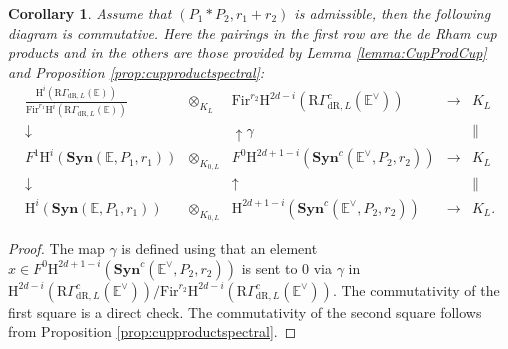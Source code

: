 \documentclass[asterisque,english]{smfart}
\newtheorem{cor}[theo]{Corollary}
\begin{document}
\begin{cor}
\label{cor:Poly R3bis} Assume that $\left( P_{1}\ast P_{2},r_{1}+r_{2}\right) $ is
admissible, then the following diagram is commutative. Here the pairings in the first row are the de Rham cup products and in the others are those provided by Lemma \ref{lemma:CupProdCup} and Proposition  \ref{prop:cupproductspectral}:
$$
\begin{array}{ccccc}
\frac{\mathrm{H}^{i}\left( \mathrm{R}\Gamma _{\mathrm{dR},L}\left( \mathbb{E}
\right) \right) }{\mathrm{Fir}^{r_{1}}\mathrm{H}^{i}\left(  \mathrm{R}\Gamma _{
\mathrm{dR},L}\left( \mathbb{E}\right) \right) } & \otimes _{K_{L}}
& \mathrm{Fir}^{r_{2}}\mathrm{H}^{2d-i}\left( \mathrm{R} \Gamma _{\mathrm{dR}
,L}^{c}\left( \mathbb{E}^\vee\right) \right) & \longrightarrow & K_{L} \\ 
\downarrow &  & \uparrow \gamma &  & \parallel \\ 
F^{1}\mathrm{H}^{i}\left( \mathbf{Syn}\left( \mathbb{E},P_1,r_1
\right) \right) & \otimes _{K_{0,L}} & F^{0}\mathrm{H}^{2d+1-i}\left( 
\mathbf{Syn}^{c}\left( \mathbb{E}^\vee,P_2,r_2\right) \right) & 
\longrightarrow & K_{L} \\ 
\downarrow &  & \uparrow &  & \parallel \\ 
\mathrm{H}^{i}\left( \mathbf{Syn}\left( \mathbb{E},P_1,r_1
\right) \right) & \otimes _{K_{0,L}} & \mathrm{H}^{2d+1-i}\left( \mathbf{
Syn}^{c}\left( \mathbb{E}^\vee,P_2,r_2\right) \right) & \longrightarrow
& K_{L}.
\end{array}
$$
\end{cor}
\begin{proof} The map $\gamma$ is defined using that an element $x\in F^{0}\mathrm{H}^{2d+1-i}\left( 
\mathbf{Syn}^{c}\left( \mathbb{E}^\vee,P_2,r_2\right) \right)$ is sent to $0$ via $\gamma$ in  $\mathrm{H}^{2d-i}\left( \mathrm{R} \Gamma _{\mathrm{dR}
,L}^{c}\left( \mathbb{E}^\vee\right) \right)/\mathrm{Fir}^{r_{2}}\mathrm{H}^{2d-i}\left( \mathrm{R} \Gamma _{\mathrm{dR} ,L}^{c}\left( \mathbb{E}^\vee\right) \right)$. 
The commutativity of the first square is a direct check. The commutativity of the second square follows
from Proposition  \ref{prop:cupproductspectral}.
\end{proof}
\end{document}
